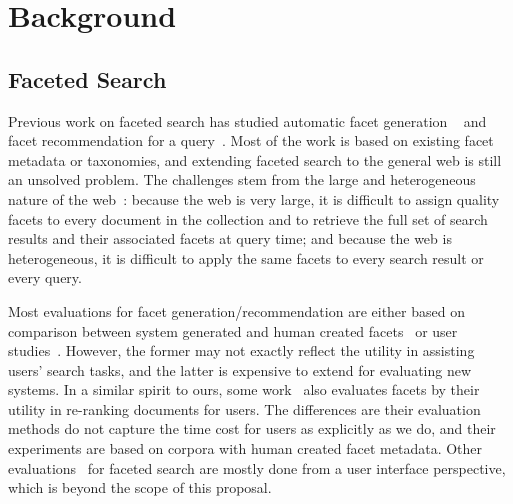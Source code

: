 \chapter{Background}
\label{ch:bg}
\section{Faceted Search}
Previous work on faceted search has studied automatic facet generation ~\cite{dakka2008automatic,li2010facetedpedia,stoica2007automating,oren2006extending,kohlschutter2006using,latha2010afgf} and facet recommendation for a query~\cite{dash2008dynamic,koren2008personalized}. Most of the work is based on existing facet metadata or taxonomies, and extending faceted search to the general web is still an unsolved problem. The challenges stem from the large and heterogeneous nature of the web~\cite{teevan2008challenges}: because the web is very large, it is
difficult to assign quality facets to every document in the collection and to retrieve the full set of search results and their associated facets at query time; and because the web is heterogeneous, it is difficult to apply the same facets to every search result or every query.

Most evaluations for facet generation/recommendation are either based on comparison between system generated and human created facets~\cite{dakka2008automatic,dou2011finding} or user studies~\cite{dash2008dynamic,li2010facetedpedia,stoica2007automating}. However, the former may not exactly reflect the utility in assisting users' search tasks, and the latter is expensive to extend for evaluating new systems. In a similar spirit to ours, some work~\cite{schuth2011evaluation,zhang2010interactive,koren2008personalized} also evaluates facets by their utility in re-ranking documents for users. The differences are their evaluation methods do not capture the time cost for users as explicitly as we do, and their experiments are based on corpora with human created facet metadata. Other evaluations~\cite{burke1996knowledge,english2002hierarchical,hearst2006design,hearst2008uis,kules2009exploratory} for faceted search are mostly done from a user interface perspective, which is beyond the scope of 
this proposal.

